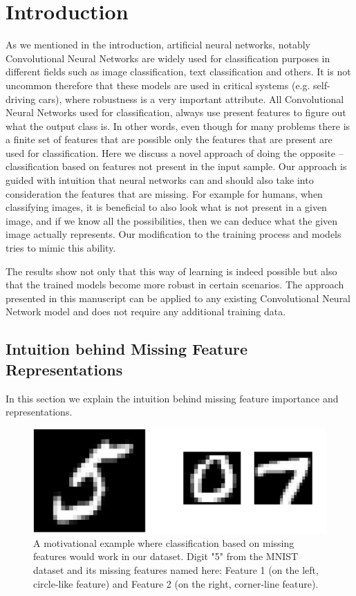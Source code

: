 \documentclass[b5paper]{book}
\begin{document}
\chapter{Introduction}

As we mentioned in the introduction, artificial neural networks, notably Convolutional Neural Networks are widely used for classification purposes in different fields such as image classification, text classification and others. It is not uncommon therefore that these models are used in critical systems (e.g. self-driving cars), where robustness is a very important attribute. All Convolutional Neural Networks used for classification, always use present features to figure out what the output class is. In other words, even though for many problems there is a finite set of features that are possible only the features that are present are used for classification. Here we discuss a novel approach of doing the opposite -- classification based on features not present in the input sample. Our approach is guided with intuition that neural networks can and should also take into consideration the features that are missing. For example for humans, when classifying images, it is beneficial to also look what is not present in a given image, and if we know all the possibilities, then we can deduce what the given image actually represents. Our modification to the training process and models tries to mimic this ability.

The results show not only that this way of learning is indeed possible but also that the trained models become more robust in certain scenarios. The approach presented in this manuscript can be applied to any existing Convolutional Neural Network model and does not require any additional training data. 

\section{Intuition behind Missing Feature Representations}

In this section we explain the intuition behind missing feature importance and representations.

\begin{figure}[!ht]
  \centering
  \includegraphics[scale=0.5, trim=0pt 0pt 0pt 0pt, clip]{motivation} 
  \caption{A motivational example where classification based on missing features would work in our dataset. Digit "5" from the MNIST dataset and its missing features named here: Feature 1 (on the left, circle-like feature) and Feature 2 (on the right, corner-line feature).}
  \label{fig:sample-motivation}
\end{figure}
\end{document}
